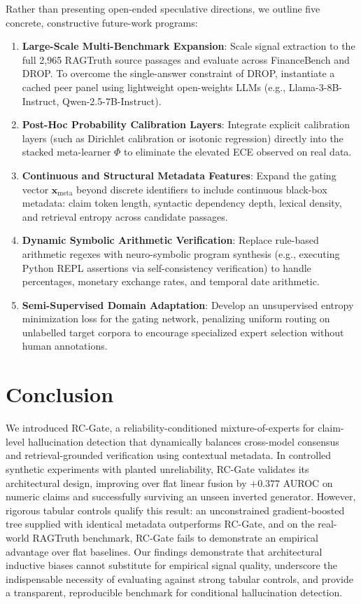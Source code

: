 \documentclass[pdflatex,sn-mathphys,Numbered]{sn-jnl}
\begin{document}
Rather than presenting open-ended speculative directions, we outline five concrete, constructive future-work programs:
\begin{enumerate}
    \item \textbf{Large-Scale Multi-Benchmark Expansion}: Scale signal extraction to the full 2,965 RAGTruth source passages and evaluate across FinanceBench and DROP. To overcome the single-answer constraint of DROP, instantiate a cached peer panel using lightweight open-weights LLMs (e.g., Llama-3-8B-Instruct, Qwen-2.5-7B-Instruct).
    \item \textbf{Post-Hoc Probability Calibration Layers}: Integrate explicit calibration layers (such as Dirichlet calibration or isotonic regression) directly into the stacked meta-learner $\Phi$ to eliminate the elevated ECE observed on real data.
    \item \textbf{Continuous and Structural Metadata Features}: Expand the gating vector $\mathbf{x}_{\mathrm{meta}}$ beyond discrete identifiers to include continuous black-box metadata: claim token length, syntactic dependency depth, lexical density, and retrieval entropy across candidate passages.
    \item \textbf{Dynamic Symbolic Arithmetic Verification}: Replace rule-based arithmetic regexes with neuro-symbolic program synthesis (e.g., executing Python REPL assertions via self-consistency verification) to handle percentages, monetary exchange rates, and temporal date arithmetic.
    \item \textbf{Semi-Supervised Domain Adaptation}: Develop an unsupervised entropy minimization loss for the gating network, penalizing uniform routing on unlabelled target corpora to encourage specialized expert selection without human annotations.
\end{enumerate}

\section{Conclusion}\label{sec:conclusion}

We introduced RC-Gate, a reliability-conditioned mixture-of-experts for claim-level hallucination detection that dynamically balances cross-model consensus and retrieval-grounded verification using contextual metadata. In controlled synthetic experiments with planted unreliability, RC-Gate validates its architectural design, improving over flat linear fusion by $+0.377$ AUROC on numeric claims and successfully surviving an unseen inverted generator. However, rigorous tabular controls qualify this result: an unconstrained gradient-boosted tree supplied with identical metadata outperforms RC-Gate, and on the real-world RAGTruth benchmark, RC-Gate fails to demonstrate an empirical advantage over flat baselines. Our findings demonstrate that architectural inductive biases cannot substitute for empirical signal quality, underscore the indispensable necessity of evaluating against strong tabular controls, and provide a transparent, reproducible benchmark for conditional hallucination detection.
\end{document}
